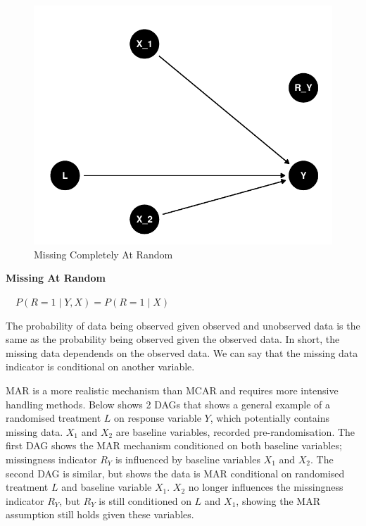 \documentclass{article}
\begin{document}
\begin{figure}

{\centering \includegraphics{Final_Report_files/figure-latex/unnamed-chunk-1-1} 

}

\caption{Missing Completely At Random}\label{fig:unnamed-chunk-1}
\end{figure}

\newpage

\textbf{Missing At Random}

\(\quad P(R = 1 \mid Y, X) = P(R = 1 \mid X)\)

The probability of data being observed given observed and unobserved
data is the same as the probability being observed given the observed
data. In short, the missing data dependends on the observed data. We can
say that the missing data indicator is conditional on another variable.

MAR is a more realistic mechanism than MCAR and requires more intensive
handling methods. Below shows 2 DAGs that shows a general example of a
randomised treatment \(L\) on response variable \(Y\), which potentially
contains missing data. \(X_1\) and \(X_2\) are baseline variables,
recorded pre-randomisation. The first DAG shows the MAR mechanism
conditioned on both baseline variables; missingness indicator \(R_Y\) is
influenced by baseline variables \(X_1\) and \(X_2\). The second DAG is
similar, but shows the data is MAR conditional on randomised treatment
\(L\) and baseline variable \(X_1\). \(X_2\) no longer influences the
missingness indicator \(R_Y\), but \(R_Y\) is still conditioned on \(L\)
and \(X_1\), showing the MAR assumption still holds given these
variables.
\end{document}
